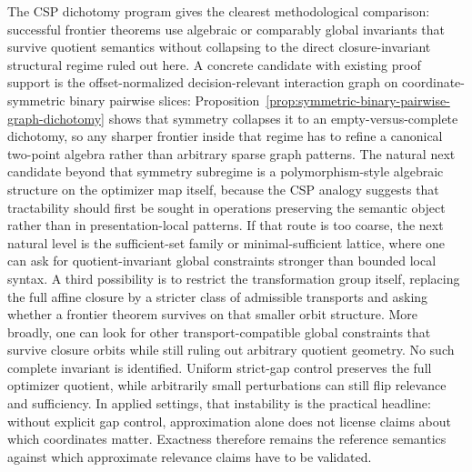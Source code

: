 The CSP dichotomy program gives the clearest methodological comparison: successful frontier theorems use algebraic or comparably global invariants that survive quotient semantics without collapsing to the direct closure-invariant structural regime ruled out here. A concrete candidate with existing proof support is the offset-normalized decision-relevant interaction graph on coordinate-symmetric binary pairwise slices: Proposition~\ref{prop:symmetric-binary-pairwise-graph-dichotomy} shows that symmetry collapses it to an empty-versus-complete dichotomy, so any sharper frontier inside that regime has to refine a canonical two-point algebra rather than arbitrary sparse graph patterns. The natural next candidate beyond that symmetry subregime is a polymorphism-style algebraic structure on the optimizer map itself, because the CSP analogy suggests that tractability should first be sought in operations preserving the semantic object rather than in presentation-local patterns. If that route is too coarse, the next natural level is the sufficient-set family or minimal-sufficient lattice, where one can ask for quotient-invariant global constraints stronger than bounded local syntax. A third possibility is to restrict the transformation group itself, replacing the full affine closure by a stricter class of admissible transports and asking whether a frontier theorem survives on that smaller orbit structure. More broadly, one can look for other transport-compatible global constraints that survive closure orbits while still ruling out arbitrary quotient geometry. No such complete invariant is identified. Uniform strict-gap control preserves the full optimizer quotient, while arbitrarily small perturbations can still flip relevance and sufficiency. In applied settings, that instability is the practical headline: without explicit gap control, approximation alone does not license claims about which coordinates matter. Exactness therefore remains the reference semantics against which approximate relevance claims have to be validated.
